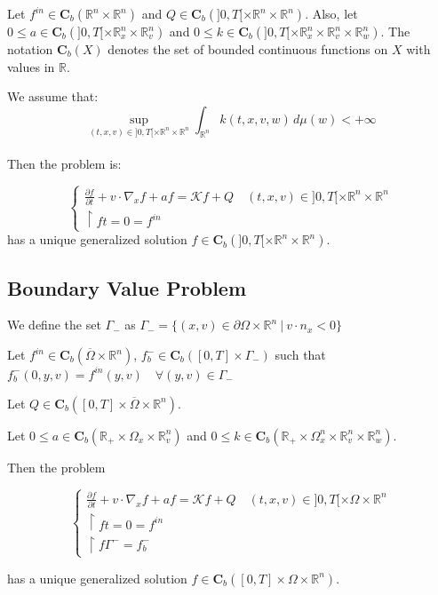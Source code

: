 \documentclass[onecolumn, 12pt, a4paper]{article}
\begin{document}
Let $f^{in} \in \mathbf{C}_b(\mathbb{R}^n \times \mathbb{R}^n)$ and $Q \in \mathbf{C}_b(]0,T[ \times \mathbb{R}^n \times \mathbb{R}^n)$. Also, let $0 \leq a \in \mathbf{C}_b(]0,T[ \times \mathbb{R}_x^n \times \mathbb{R}_v^n)$ and $0 \leq k \in \mathbf{C}_b(]0,T[ \times \mathbb{R}_x^n \times \mathbb{R}_v^n \times \mathbb{R}_w^n)$. The notation $\mathbf{C}_b(X)$ denotes the set of bounded continuous functions on $X$ with values in $\mathbb{R}$.


We assume that:  \[ \underset{(t,x,v) \in ]0,T[ \times \mathbb{R}^n \times \mathbb{R}^n}{\sup} \int_{\mathbb{R}^n} k(t,x,v,w) \, d\mu(w) < +\infty \]

\paragraph{}

Then the problem is:

\[
\begin{cases}
\frac{\partial f}{\partial t}+v \cdot \nabla_x f +af =   \mathcal{K} f +Q \quad (t,x,v) \in ]0,T[ \times \mathbb{R}^n \times \mathbb{R}^n\\
\restriction{f}{t=0}= f^{in}
\end{cases}
\]
has a unique generalized solution $f \in \mathbf{C}_b(]0,T[ \times \mathbb{R}^n \times \mathbb{R}^n)$.

\subsection{Boundary Value Problem}

We define the set $\Gamma_-$ as $\Gamma_-= \{(x,v) \in \partial \Omega \times \mathbb{R}^n ~ | ~ v\cdot n_x<0\}$

Let $f^{in} \in \mathbf{C}_b(\overline{\Omega} \times \mathbb{R}^n)$, $f_b^- \in \mathbf{C}_b([0,T] \times \Gamma_-)$ such that $f_b^-(0,y,v)=f^{in}(y,v) \quad \forall (y,v) \in \Gamma_-$

Let $Q \in \mathbf{C}_b([0,T] \times \overline{\Omega} \times \mathbb{R}^n)$.

Let $0 \leq a \in \mathbf{C}_b(\mathbb{R}_+ \times \Omega_x \times \mathbb{R}_v^n)$ and $0 \leq k \in \mathbf{C}_b(\mathbb{R}_+ \times \Omega_x^n \times \mathbb{R}_v^n \times \mathbb{R}_w^n)$.

Then the problem

\[
\begin{cases}
\frac{\partial f}{\partial t}+v \cdot \nabla_x f +af =   \mathcal{K} f +Q \quad (t,x,v) \in ]0,T[ \times \Omega \times \mathbb{R}^n\\
\restriction{f}{t=0}= f^{in}\\
\restriction{f}{\Gamma^-}=f_b^-
\end{cases}
\]

has a unique generalized solution $f \in \mathbf{C}_b([0,T] \times \Omega \times \mathbb{R}^n)$.
\end{document}
